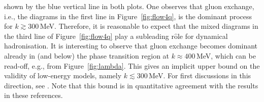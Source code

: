 \documentclass[%
reprint,
superscriptaddress,
showpacs,preprintnumbers,
 amsmath,amssymb,
 aps,
prd,
]{revtex4-1}
\def\Fig#1{Figure~\ref{#1}}
\begin{document}
shown by the blue vertical line in both plots. One observes that gluon
exchange, i.e., the diagrams in the first line in \Fig{fig:flow4q}, is
the dominant process for $k \gtrsim 300$\,MeV. Therefore, it is
reasonable to expect that the mixed diagrams in the third line of
\Fig{fig:flow4q} play a subleading r$\hat{\textrm{o}}$le for dynamical
hadronisation. It is interesting to observe that gluon exchange
becomes dominant already in (and below) the phase transition region at
$k \approx 400$\,MeV, which can be read-off, e.g., from
\Fig{fig:lambda}. This gives an implicit upper bound on the validity
of low-energy models, namely $k \lesssim 300$\,MeV. For first
discussions in this direction, see \cite{Rennecke:2015,
  Alkofer:2018guy}. Note that this bound is in quantitative agreement
with the results in these references.
\end{document}
